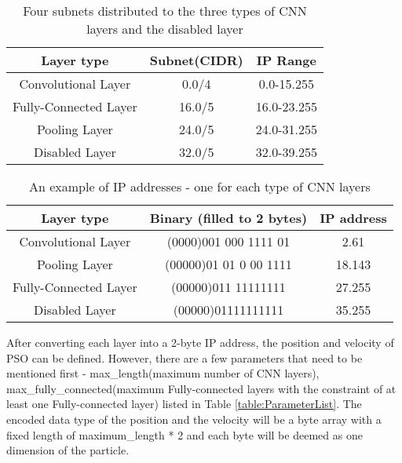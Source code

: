 \documentclass[conference]{IEEEtran}
\begin{document}
\begin{table}[!t]
	\renewcommand{\arraystretch}{1.3}
	\caption{Four subnets distributed to the three types of CNN layers and the disabled layer}
	\label{table:Subnets}
	\centering
	\begin{tabular}{|c|c|c|}
		\hline
		Layer type & Subnet(CIDR) & IP Range\\
		\hline
		Convolutional Layer & 0.0/4 & 0.0-15.255\\
		\hline
		Fully-Connected Layer & 16.0/5 & 16.0-23.255\\
		\hline
		Pooling Layer & 24.0/5 & 24.0-31.255\\
		\hline
		Disabled Layer & 32.0/5 & 32.0-39.255\\
		\hline
	\end{tabular}
\end{table}

\begin{table}[!t]
	\renewcommand{\arraystretch}{1.3}
	\caption{An example of IP addresses - one for each type of CNN layers}
	\label{table:IPExample}
	\centering
	\begin{tabular}{|c|c|c|}
		\hline
		Layer type & Binary (filled to 2 bytes) & IP address\\
		\hline
		Convolutional Layer & (0000)001 000 1111 01 & 2.61\\
		\hline
		Pooling Layer & (00000)01 01 0 00 1111 & 18.143\\
		\hline
		Fully-Connected Layer & (00000)011 11111111 & 27.255\\
		\hline
		Disabled Layer & (00000)01111111111 & 35.255\\
		\hline
	\end{tabular}
\end{table}


After converting each layer into a 2-byte IP address, the position and velocity of PSO can be defined. However, there are a few parameters that need to be mentioned first - max\_length(maximum number of CNN layers), max\_fully\_connected(maximum Fully-connected layers with the constraint of at least one Fully-connected layer) listed in Table \ref{table:ParameterList}. The encoded data type of the position and the velocity will be a byte array with a fixed length of maximum\_length * 2 and each byte will be deemed as one dimension of the particle.
\end{document}
